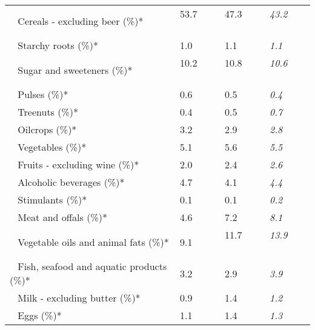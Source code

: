 \begin{tabular}{L{3.9cm} R{1cm} R{1cm} R{1cm}}
	 ~ Cereals - excluding beer (\%)* & 53.7 ~ \ \ & 47.3 ~ \ \ & \textit{43.2} ~ \ \ \\ 
	 ~ Starchy roots (\%)* & 1.0 ~ \ \ & 1.1 ~ \ \ & \textit{1.1} ~ \ \ \\ 
	 ~ Sugar and sweeteners (\%)* & 10.2 ~ \ \ & 10.8 ~ \ \ & \textit{10.6} ~ \ \ \\ 
	 ~ Pulses (\%)* & 0.6 ~ \ \ & 0.5 ~ \ \ & \textit{0.4} ~ \ \ \\ 
	 ~ Treenuts (\%)* & 0.4 ~ \ \ & 0.5 ~ \ \ & \textit{0.7} ~ \ \ \\ 
	 ~ Oilcrops (\%)* & 3.2 ~ \ \ & 2.9 ~ \ \ & \textit{2.8} ~ \ \ \\ 
	 ~ Vegetables (\%)* & 5.1 ~ \ \ & 5.6 ~ \ \ & \textit{5.5} ~ \ \ \\ 
	 ~ Fruits - excluding wine (\%)* & 2.0 ~ \ \ & 2.4 ~ \ \ & \textit{2.6} ~ \ \ \\ 
	 ~ Alcoholic beverages (\%)* & 4.7 ~ \ \ & 4.1 ~ \ \ & \textit{4.4} ~ \ \ \\ 
	 ~ Stimulants (\%)* & 0.1 ~ \ \ & 0.1 ~ \ \ & \textit{0.2} ~ \ \ \\ 
	 ~ Meat and offals (\%)* & 4.6 ~ \ \ & 7.2 ~ \ \ & \textit{8.1} ~ \ \ \\ 
	 ~ Vegetable oils and animal fats (\%)* & 9.1 ~ \ \ & 11.7 ~ \ \ & \textit{13.9} ~ \ \ \\ 
	 ~ Fish, seafood and aquatic products (\%)* & 3.2 ~ \ \ & 2.9 ~ \ \ & \textit{3.9} ~ \ \ \\ 
	 ~ Milk - excluding butter (\%)* & 0.9 ~ \ \ & 1.4 ~ \ \ & \textit{1.2} ~ \ \ \\ 
	 ~ Eggs (\%)* & 1.1 ~ \ \ & 1.4 ~ \ \ & \textit{1.3} ~ \ \ \\ 
       \toprule
      \end{tabular}
      \clearpage
{}
